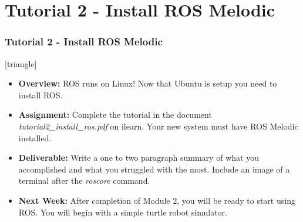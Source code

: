 \documentclass[fleqn]{beamer} %
\newcommand{\sectiontitleV}{Tutorial 2 - Install ROS Melodic}
\begin{document}
\section{\sectiontitleV}	
	            \begin{frame}[label=sectionV] \small
		\frametitle{\sectiontitleV}    
	
 [triangle]
                \begin{itemize}

					\item {\bf Overview:} ROS runs on Linux! Now that Ubuntu is setup you need to install ROS. 		

					\item {\bf Assignment:} Complete the tutorial in the document {\it tutorial2\_install\_ros.pdf} on ilearn. Your new system must have ROS Melodic installed.
                    
                    \item {\bf Deliverable:} Write a one to two paragraph summary of what you accomplished and what you struggled with the most. Include an image of a terminal after the {\it roscore} command. 
    
                    \item {\bf Next Week:} After completion of Module 2, you will be ready to start using ROS. You will begin with a simple turtle robot simulator. \vspc
                    
                    
    
                    
                \end{itemize}
		\end{frame}
\end{document}
